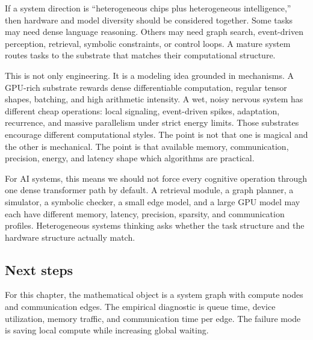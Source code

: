 If a system direction is ``heterogeneous chips plus heterogeneous intelligence,'' then hardware and model diversity should be considered together. Some tasks may need dense language reasoning. Others may need graph search, event-driven perception, retrieval, symbolic constraints, or control loops. A mature system routes tasks to the substrate that matches their computational structure.

This is not only engineering. It is a modeling idea grounded in mechanisms. A GPU-rich substrate rewards dense differentiable computation, regular tensor shapes, batching, and high arithmetic intensity. A wet, noisy nervous system has different cheap operations: local signaling, event-driven spikes, adaptation, recurrence, and massive parallelism under strict energy limits. Those substrates encourage different computational styles. The point is not that one is magical and the other is mechanical. The point is that available memory, communication, precision, energy, and latency shape which algorithms are practical.

For AI systems, this means we should not force every cognitive operation through one dense transformer path by default. A retrieval module, a graph planner, a simulator, a symbolic checker, a small edge model, and a large GPU model may each have different memory, latency, precision, sparsity, and communication profiles. Heterogeneous systems thinking asks whether the task structure and the hardware structure actually match.

\subsection{Next steps}

For this chapter, the mathematical object is a system graph with compute nodes and communication edges. The empirical diagnostic is queue time, device utilization, memory traffic, and communication time per edge. The failure mode is saving local compute while increasing global waiting.

